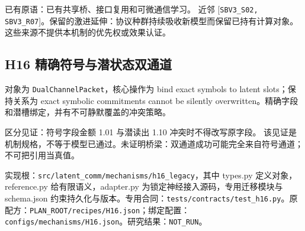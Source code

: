 \documentclass[
  10pt,
]{article}
\begin{document}
已有原语：已有共享桥、接口复用和可微通信学习。 近邻
{[}\nolinkurl{SBV3_S02,}
\nolinkurl{SBV3_R07}{]}。保留的激进延伸：协议种群持续吸收新模型而保留已持有计算对象。
这些来源不提供本机制的优先权或效果认证。

\subsection{H16
精确符号与潜状态双通道}\label{h16-ux7cbeux786eux7b26ux53f7ux4e0eux6f5cux72b6ux6001ux53ccux901aux9053}

对象为 \nolinkurl{DualChannelPacket}，核心操作为 bind exact symbols to
latent slots；保持关系为 exact symbolic commitments cannot be silently
overwritten。精确字段和潜槽绑定，并有不可静默覆盖的冲突策略。

区分见证：符号字段金额 1.01 与潜读出 1.10 冲突时不得改写原字段。
该见证是机制规格，不等于模型已通过。未证明桥梁：双通道成功可能完全来自符号通道；不可把引用当真值。

实现根：{\small\nolinkurl{src/latent_comm/mechanisms/h16_legacy}}，其中
types.py 定义对象，reference.py 给有限语义，adapter.py
为锁定神经接入源码，专用迁移模块与 schema.json
约束持久化与版本。专用合同：{\small\nolinkurl{tests/contracts/test_h16.py}}。原配方：{\small\nolinkurl{PLAN_ROOT/recipes/H16.json}}；绑定配置：{\small\nolinkurl{configs/mechanisms/H16.json}}。研究结果：\nolinkurl{NOT_RUN}。
\end{document}
